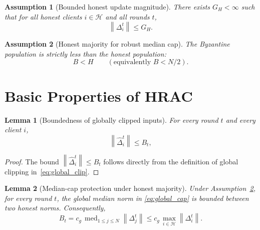 \documentclass[11pt,a4paper]{article}
\newtheorem{assumption}{Assumption}
\newtheorem{lemma}{Lemma}
\theoremstyle{remark}
\newcommand{\HH}{\mathcal{H}}
\newcommand{\med}{\operatorname{med}}
\newcommand{\norm}[1]{\left\lVert #1 \right\rVert}
\begin{document}
\begin{assumption}[Bounded honest update magnitude]
\label{ass:honest_update_bound}
There exists \(G_H<\infty\) such that for all honest clients \(i\in\HH\) and
all rounds \(t\),
\begin{equation}
    \norm{\Delta_i^t}\le G_H.
    \label{eq:honest_update_bound}
\end{equation}
\end{assumption}

\begin{assumption}[Honest majority for robust median cap]
\label{ass:honest_majority}
The Byzantine population is strictly less than the honest population:
\begin{equation}
    B < H
    \qquad(\text{equivalently } B < N/2).
    \label{eq:honest_majority}
\end{equation}
\end{assumption}

\section{Basic Properties of HRAC}

\begin{lemma}[Boundedness of globally clipped inputs]
\label{lem:bounded}
For every round \(t\) and every client \(i\),
\begin{equation}
    \norm{\hat{\Delta}_i^t} \le B_t,
    \label{eq:uniform_bound}
\end{equation}
\end{lemma}

\begin{proof}
The bound \(\norm{\hat{\Delta}_i^t} \le B_t\) follows directly from the
definition of global clipping in~\eqref{eq:global_clip}.

\end{proof}

\begin{lemma}[Median-cap protection under honest majority]
\label{lem:median_cap_honest}
Under Assumption~\ref{ass:honest_majority}, for every round \(t\), the global
median norm in \eqref{eq:global_cap} is bounded between two honest norms.
Consequently,
\begin{equation}
    B_t
    =
    c_g\,\med_{1\le j\le N}\norm{\Delta_j^t}
    \le
    c_g\,\max_{i\in\HH}\norm{\Delta_i^t}.
    \label{eq:median_honest_bound}
\end{equation}
\end{lemma}
\end{document}
